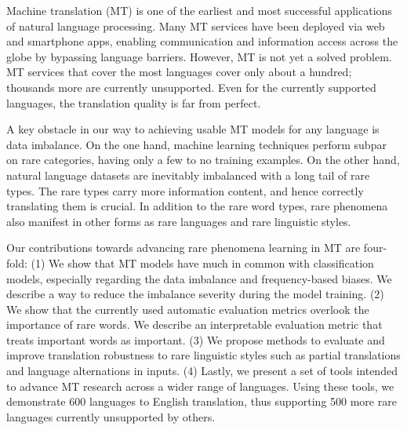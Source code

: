 

Machine translation (MT) is one of the earliest and most successful applications of natural language processing. Many MT services have been deployed via web and smartphone apps, enabling communication and information access across the globe by bypassing language barriers. However, MT is not yet a solved problem. MT services that cover the most languages cover only about a hundred; thousands more are currently unsupported. Even for the currently supported languages, the translation quality is far from perfect.

A key obstacle in our way to achieving usable MT models for any language is data imbalance. On the one hand, machine learning techniques perform subpar on rare categories, having only a few to no training examples. On the other hand, natural language datasets are inevitably imbalanced with a long tail of rare types. The rare types carry more information content, and hence correctly translating them is crucial. In addition to the rare word types, rare phenomena also manifest in other forms as rare languages and rare linguistic styles.

Our contributions towards advancing rare phenomena learning in MT are four-fold: (1) We show that MT models have much in common with classification models, especially regarding the data imbalance and frequency-based biases. We describe a way to reduce the imbalance severity during the model training. (2) We show that the currently used automatic evaluation metrics overlook the importance of rare words. We describe an interpretable evaluation metric that treats important words as important. (3) We propose methods to evaluate and improve translation robustness to rare linguistic styles such as partial translations and language alternations in inputs. (4) Lastly, we present a set of tools intended to advance MT research across a wider range of languages. Using these tools, we demonstrate 600 languages to English translation, thus supporting 500 more rare languages currently unsupported by others.
